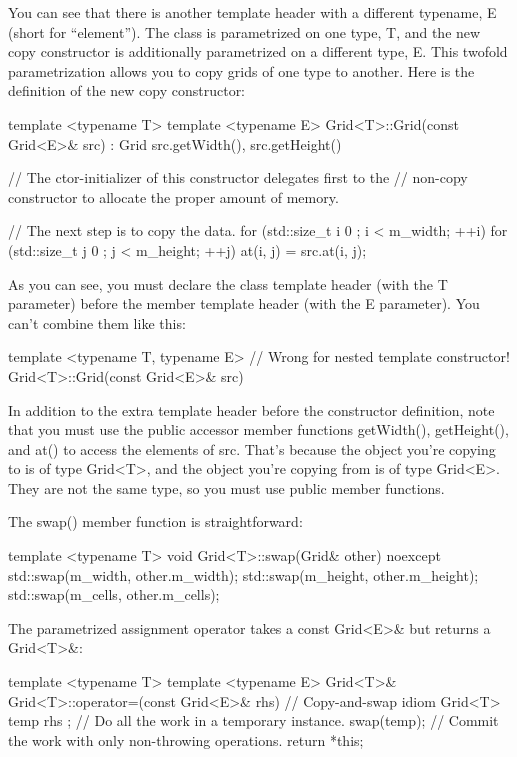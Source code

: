 You can see that there is another template header with a different typename, E (short for “element”). The class is parametrized on one type, T, and the new copy constructor is additionally parametrized on a different type, E. This twofold parametrization allows you to copy grids of one type to another. Here is the definition of the new copy constructor:

\begin{cpp}
template <typename T>
template <typename E>
Grid<T>::Grid(const Grid<E>& src)
    : Grid { src.getWidth(), src.getHeight() }
{
    // The ctor-initializer of this constructor delegates first to the
    // non-copy constructor to allocate the proper amount of memory.

    // The next step is to copy the data.
    for (std::size_t i { 0 }; i < m_width; ++i) {
        for (std::size_t j { 0 }; j < m_height; ++j) {
            at(i, j) = src.at(i, j);
        }
    }
}
\end{cpp}

As you can see, you must declare the class template header (with the T parameter) before the member template header (with the E parameter). You can’t combine them like this:

\begin{cpp}
template <typename T, typename E> // Wrong for nested template constructor!
Grid<T>::Grid(const Grid<E>& src)
\end{cpp}

In addition to the extra template header before the constructor definition, note that you must use the public accessor member functions getWidth(), getHeight(), and at() to access the elements of src. That’s because the object you’re copying to is of type Grid<T>, and the object you’re copying from is of type Grid<E>. They are not the same type, so you must use public member functions.

The swap() member function is straightforward:

\begin{cpp}
template <typename T>
void Grid<T>::swap(Grid& other) noexcept
{
    std::swap(m_width, other.m_width);
    std::swap(m_height, other.m_height);
    std::swap(m_cells, other.m_cells);
}
\end{cpp}

The parametrized assignment operator takes a const Grid<E>\& but returns a Grid<T>\&:

\begin{cpp}
template <typename T>
template <typename E>
Grid<T>& Grid<T>::operator=(const Grid<E>& rhs)
{
    // Copy-and-swap idiom
    Grid<T> temp { rhs }; // Do all the work in a temporary instance.
    swap(temp); // Commit the work with only non-throwing operations.
    return *this;
}
\end{cpp}


